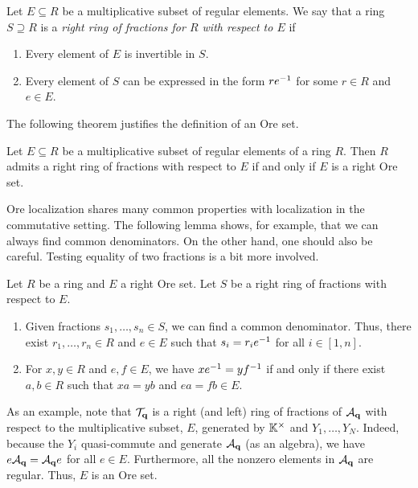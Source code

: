 Let $E \subseteq R$ be a multiplicative subset of regular elements. We say that a ring
$S \supseteq R$ is a \emph{right ring of fractions for $R$ with respect to
	$E$} if
\begin{enumerate}
	\item Every element of $E$ is invertible in $S$.
	\item Every element of $S$ can be expressed in the form $re^{-1}$ for some $r \in R$ and $e
		      \in E$.
\end{enumerate}
The following theorem justifies the definition of an Ore set.
\begin{theorem}\cite[Theorem 6.2]{GoodearlWarfield2004NoncommutativeNR}
	Let $E \subseteq R$ be a multiplicative subset of regular elements of a ring $R$. Then $R$ admits a right ring of fractions with respect to $E$ if and only if $E$ is a right Ore set.
\end{theorem}
%
Ore localization shares many common properties with localization in the commutative
setting. The following lemma shows, for example, that we can always find common
denominators. On the other hand, one should also be careful. Testing equality of two
fractions is a bit more involved.
\begin{lemma}\label{lem:ore_set_properties}
	Let $R$ be a ring and $E$ a right Ore set. Let $S$ be a right ring of fractions with respect to $E$.
	\begin{enumerate}
		\item Given fractions $s_1, \dots, s_n \in S$, we can find a common denominator. Thus, there
		      exist $r_1, \dots, r_n \in R$ and $e \in E$ such that $s_i = r_i e^{-1}$ for all $i \in
			      [1, n]$.
		\item For $x, y \in R$ and $e, f \in E$, we have $x e ^{-1} = y f ^{-1}$ if and only if there
		      exist $a,b \in R$ such that $xa = yb$ and $ea = fb \in E$.
	\end{enumerate}
\end{lemma}

As an example, note that $\mathcal{T}_{\mathbf{q}}$ is a right (and left) ring of fractions of
$\mathcal{A}_{\mathbf{q}}$ with respect to the multiplicative subset, $E$, generated by $\mathbb{K}^\times$
and $Y_1, \dots, Y_N$. Indeed, because the $Y_i$ quasi-commute and generate $\mathcal{A}_{\mathbf{q}}$
(as an algebra), we have $e \mathcal{A}_{\mathbf{q}} = \mathcal{A}_{\mathbf{q}} e$ for all $e \in E$. Furthermore,
all the nonzero elements in $\mathcal{A}_{\mathbf{q}}$ are regular. Thus, $E$ is an Ore set.

